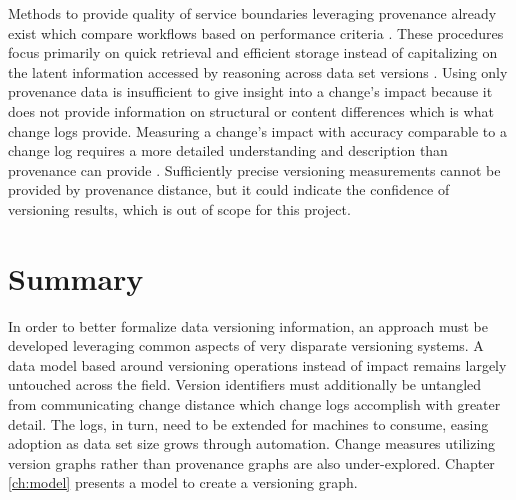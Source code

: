 Methods to provide quality of service boundaries leveraging provenance already exist which compare workflows based on performance criteria \cite{2015:CAA:2778374.2778504}.
These procedures focus primarily on quick retrieval and efficient storage instead of capitalizing on the latent information accessed by reasoning across data set versions \cite{tan2004research}.
Using only provenance data is insufficient to give insight into a change's impact because it does not provide information on structural or content differences which is what change logs provide.
Measuring a change's impact with accuracy comparable to a change log requires a more detailed understanding and description than provenance can provide  \cite{Bose:2005:LRS:1057977.1057978}.
Sufficiently precise versioning measurements cannot be provided by provenance distance, but it could indicate the confidence of versioning results, which is out of scope for this project.

\section{Summary}

In order to better formalize data versioning information, an approach must be developed leveraging common aspects of very disparate versioning systems.
A data model based around versioning operations instead of impact remains largely untouched across the field.
Version identifiers must additionally be untangled from communicating change distance which change logs accomplish with greater detail.
The logs, in turn, need to be extended for machines to consume, easing adoption as data set size grows through automation.
Change measures utilizing version graphs rather than provenance graphs are also under-explored.
Chapter \ref{ch:model} presents a model to create a versioning graph.

